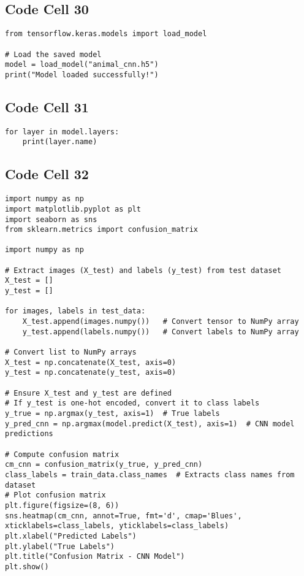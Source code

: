 \documentclass{article}
\begin{document}
\subsection*{Code Cell 30}
\begin{lstlisting}
from tensorflow.keras.models import load_model

# Load the saved model
model = load_model("animal_cnn.h5")
print("Model loaded successfully!")
\end{lstlisting}

\subsection*{Code Cell 31}
\begin{lstlisting}
for layer in model.layers:
    print(layer.name)
\end{lstlisting}

\subsection*{Code Cell 32}
\begin{lstlisting}
import numpy as np
import matplotlib.pyplot as plt
import seaborn as sns
from sklearn.metrics import confusion_matrix

import numpy as np

# Extract images (X_test) and labels (y_test) from test dataset
X_test = []
y_test = []

for images, labels in test_data:
    X_test.append(images.numpy())   # Convert tensor to NumPy array
    y_test.append(labels.numpy())   # Convert labels to NumPy array

# Convert list to NumPy arrays
X_test = np.concatenate(X_test, axis=0)
y_test = np.concatenate(y_test, axis=0)

# Ensure X_test and y_test are defined
# If y_test is one-hot encoded, convert it to class labels
y_true = np.argmax(y_test, axis=1)  # True labels
y_pred_cnn = np.argmax(model.predict(X_test), axis=1)  # CNN model predictions

# Compute confusion matrix
cm_cnn = confusion_matrix(y_true, y_pred_cnn)
class_labels = train_data.class_names  # Extracts class names from dataset
# Plot confusion matrix
plt.figure(figsize=(8, 6))
sns.heatmap(cm_cnn, annot=True, fmt='d', cmap='Blues', xticklabels=class_labels, yticklabels=class_labels)
plt.xlabel("Predicted Labels")
plt.ylabel("True Labels")
plt.title("Confusion Matrix - CNN Model")
plt.show()
\end{lstlisting}
\end{document}
